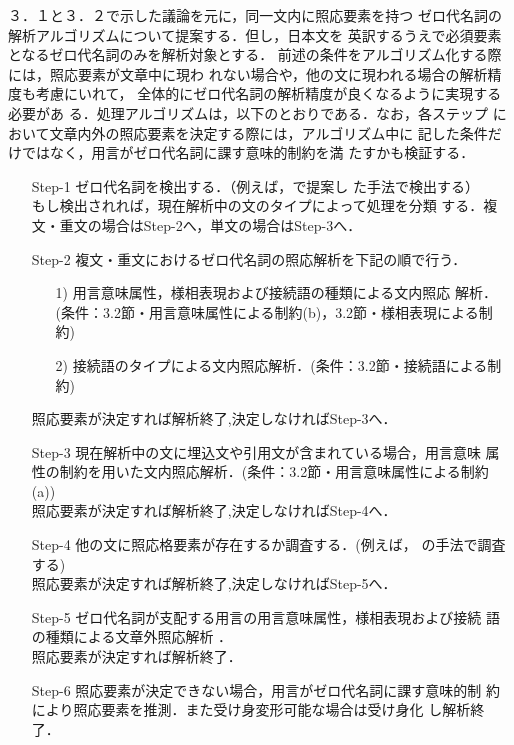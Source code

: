３．１と３．２で示した議論を元に，同一文内に照応要素を持つ
ゼロ代名詞の解析アルゴリズムについて提案する．但し，日本文を
英訳するうえで必須要素となるゼロ代名詞のみを解析対象とする．
前述の条件をアルゴリズム化する際には，照応要素が文章中に現わ
れない場合や，他の文に現われる場合の解析精度も考慮にいれて，
全体的にゼロ代名詞の解析精度が良くなるように実現する必要があ
る．処理アルゴリズムは，以下のとおりである．なお，各ステップ
において文章内外の照応要素を決定する際には，アルゴリズム中に
記した条件だけではなく，用言がゼロ代名詞に課す意味的制約を満
たすかも検証する．
\vspace*{2.5mm}
\begin{enumerate}
\item[Step-1] ゼロ代名詞を検出する．（例えば，\cite{NakaiwaIkehara1993}で提案し
た手法で検出する）\\
もし検出されれば，現在解析中の文のタイプによって処理を分類
する．複文・重文の場合はStep-2へ，単文の場合はStep-3へ．
\item[Step-2] 複文・重文におけるゼロ代名詞の照応解析を下記の順で行う．
\begin{enumerate}
\item[1)]用言意味属性，様相表現および接続語の種類による文内照応
解析．(条件：3.2節・用言意味属性による制約(b)，3.2節・様相表現による制約)
\item[2)]接続語のタイプによる文内照応解析．(条件：3.2節・接続語による制約)
\end{enumerate}
照応要素が決定すれば解析終了,決定しなければStep-3へ．
\item[Step-3] 現在解析中の文に埋込文や引用文が含まれている場合，用言意味
属性の制約を用いた文内照応解析．(条件：3.2節・用言意味属性による制約(a))\\
照応要素が決定すれば解析終了,決定しなければStep-4へ．
\item[Step-4] 他の文に照応格要素が存在するか調査する．(例えば，
\cite{NakaiwaIkehara1993}の手法で調査する) \\
照応要素が決定すれば解析終了,決定しなければStep-5へ．
\item[Step-5] ゼロ代名詞が支配する用言の用言意味属性，様相表現および接続
語の種類による文章外照応解析
\cite{NakaiwaShiraiIkehara1994,NakaiwaShiraiIkeharaKawaoka1995}．\\
照応要素が決定すれば解析終了．
\item[Step-6] 照応要素が決定できない場合，用言がゼロ代名詞に課す意味的制
約により照応要素を推測．また受け身変形可能な場合は受け身化
し解析終了．
\end{enumerate}

